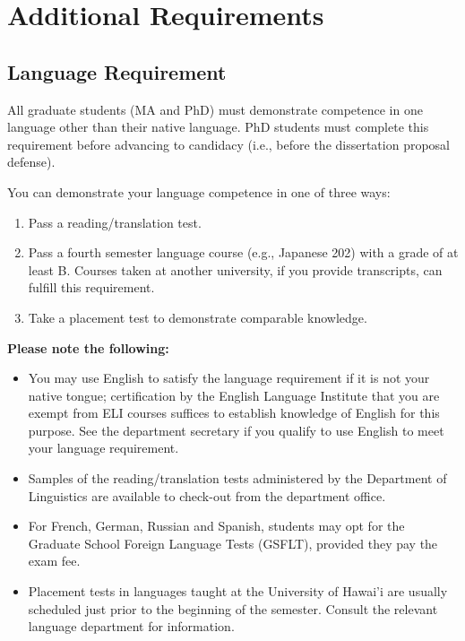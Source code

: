 \documentclass[
]{book}
\providecommand{\tightlist}{%
  \setlength{\itemsep}{0pt}\setlength{\parskip}{0pt}}
\begin{document}
\chapter{Additional Requirements}\label{additional-requirements}

\section{Language Requirement}\label{language-requirement}

All graduate students (MA and PhD) must demonstrate competence in one language other than their native language. PhD students must complete this requirement before advancing to candidacy (i.e., before the dissertation proposal defense).

You can demonstrate your language competence in one of three ways:

\begin{enumerate}
\def\labelenumi{\arabic{enumi}.}
\tightlist
\item
  Pass a reading/translation test.
\item
  Pass a fourth semester language course (e.g., Japanese 202) with a grade of at least B. Courses taken at another university, if you provide transcripts, can fulfill this requirement.
\item
  Take a placement test to demonstrate comparable knowledge.
\end{enumerate}

\textbf{Please note the following:}

\begin{itemize}
\tightlist
\item
  You may use English to satisfy the language requirement if it is not your native tongue; certification by the English Language Institute that you are exempt from ELI courses suffices to establish knowledge of English for this purpose. See the department secretary if you qualify to use English to meet your language requirement.
\item
  Samples of the reading/translation tests administered by the Department of Linguistics are available to check-out from the department office.
\item
  For French, German, Russian and Spanish, students may opt for the Graduate School Foreign Language Tests (GSFLT), provided they pay the exam fee.
\item
  Placement tests in languages taught at the University of Hawai'i are usually scheduled just prior to the beginning of the semester. Consult the relevant language department for information.
\end{itemize}
\end{document}
